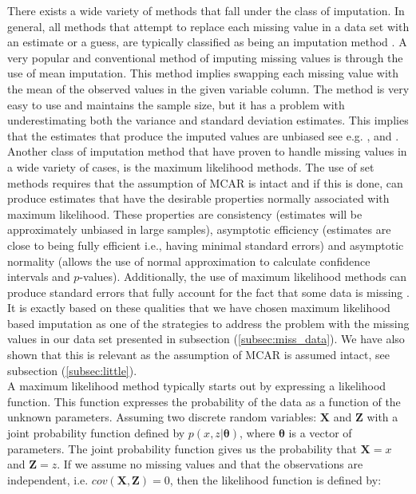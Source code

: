 \documentclass[../thesis.tex]{subfiles}
\begin{document}
\noindent There exists a wide variety of methods that fall under the class of imputation. In general, all methods that attempt to replace each missing value in a data set with an estimate or a guess, are typically classified as being an imputation method \citep{allison1999missing}. A very popular and conventional method of imputing missing values is through the use of mean imputation. This method implies swapping each missing value with the mean of the observed values in the given variable column. The method is very easy to use and maintains the sample size, but it has a problem with underestimating both the variance and standard deviation estimates. This implies that the estimates that produce the imputed values are unbiased see e.g. \cite{scheffer2002dealing}, \cite{enders2010applied} and \cite{eekhout2012brief}. Another class of imputation method that have proven to handle missing values in a wide variety of cases, is the maximum likelihood methods. The use of set methods requires that the assumption of MCAR is intact and if this is done, can produce estimates that have the desirable properties normally associated with maximum likelihood. These properties are consistency (estimates will be approximately unbiased in large samples), asymptotic efficiency (estimates are close to being fully efficient i.e., having minimal standard errors) and asymptotic normality (allows the use of normal approximation to calculate confidence intervals and $p$-values). Additionally, the use of maximum likelihood methods can produce standard errors that fully account for the fact that some data is missing \citep{allison1999missing}. It is exactly based on these qualities that we have chosen maximum likelihood based imputation as one of the strategies to address the problem with the missing values in our data set presented in subsection (\ref{subsec:miss_data}). We have also shown that this is relevant as the assumption of MCAR is assumed intact, see subsection (\ref{subsec:little}).\\
\indent A maximum likelihood method typically starts out by expressing a likelihood function. This function expresses the probability of the data as a function of the unknown parameters. Assuming two discrete random variables: $\mathbf{X}$ and $\mathbf{Z}$ with a joint probability function defined by $p(x,z|\boldsymbol{\theta})$, where $\boldsymbol{\theta}$ is a vector of parameters. The joint probability function gives us the probability that $\mathbf{X} = x$ and $\mathbf{Z} = z$. If we assume no missing values and that the observations are independent, i.e. $cov(\mathbf{X}, \mathbf{Z}) = 0$, then the likelihood function is defined by:
\end{document}
